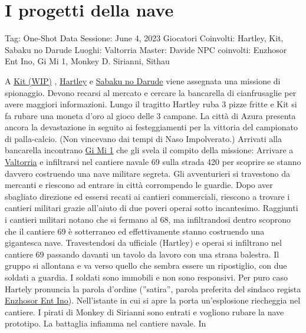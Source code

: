 \section{I progetti della nave}\label{i-progetti-della-nave}

Tag: One-Shot Data Sessione: June 4, 2023 Giocatori Coinvolti: Hartley,
Kit, Sabaku no Darude Luoghi: Valtorria Master: Davide NPC coinvolti:
Enzhosor Ent Ino, Gi Mi 1, Monkey D. Sirianni, Sithau

A \href{Kit\%20(WIP)\%206fa9f39f12df44b5886783e9e3370c50.md}{Kit (WIP)}
, \href{Hartley\%204807c6b74b3b43cc9a03aed37fc44b83.md}{Hartley} e
\href{Sabaku\%20no\%20Darude\%209c414f3e551144f4acee665cab478336.md}{Sabaku
no Darude} viene assegnata una missione di spionaggio. Devono recarsi al
mercato e cercare la bancarella di cianfrusaglie per avere maggiori
informazioni. Lungo il tragitto Hartley ruba 3 pizze fritte e Kit si fa
rubare una moneta d'oro al gioco delle 3 campane. La città di Azura
presenta ancora la devastazione in seguito ai festeggiamenti per la
vittoria del campionato di palla-calcio. (Non vincevano dai tempi di
Naso Impolverato.) Arrivati alla bancarella incontrano
\href{Gi\%20Mi\%201\%20cab17ff310e546dc9f1f92664fedf682.md}{Gi Mi 1} che
gli svela il compito della missione: Arrivare a
\href{Valtorria\%207d27576509654ad4bfa1584e38753d6a.md}{Valtorria} e
infiltrarsi nel cantiere navale 69 sulla strada 420 per scoprire se
stanno davvero costruendo una nave militare segreta. Gli avventurieri si
travestono da mercanti e riescono ad entrare in città corrompendo le
guardie. Dopo aver sbagliato direzione ed essersi recati ai cantieri
commerciali, riescono a trovare i cantieri militari grazie all'aiuto di
due poveri operai sotto incantesimo. Raggiunti i cantieri militari
notano che si fermano al 68, ma infiltrandosi dentro scoprono che il
cantiere 69 è sotterraneo ed effettivamente stanno costruendo una
gigantesca nave. Travestendosi da ufficiale (Hartley) e operai si
infiltrano nel cantiere 69 passando davanti un tavolo da lavoro con una
strana balestra. Il gruppo si allontana e va verso quello che sembra
essere un ripostiglio, con due soldati a guardia. I soldati sono
immobili e non sono responsivi. Per puro caso Hartely pronuncia la
parola d'ordine (''satira'', parola preferita del sindaco regista
\href{Enzhosor\%20Ent\%20Ino\%20d098e258d48c4aaea0dccbf531c4688c.md}{Enzhosor
Ent Ino}). Nell'istante in cui si apre la porta un'esplosione riecheggia
nel cantiere. I pirati di Monkey di Sirianni sono entrati e vogliono
rubare la nave prototipo. La battaglia infiamma nel cantiere navale. In
